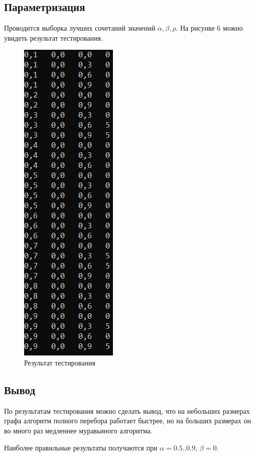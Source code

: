 \documentclass[14pt, a4paper]{extarticle}
\begin{document}
\subsection{Параметризация}
Проводится выборка лучших сочетаний значений $\alpha, \beta, \rho$. На рисунке 6 можно увидеть результат тестирования.
\begin{figure}[h!]
	\centering
	\includegraphics[scale=1]{source/test.png}
	\caption{Результат тестирования}
\end{figure}
\subsection{Вывод}
По результатам тестирования можно сделать вывод, что на небольших размерах графа алгоритм полного перебора работает быстрее, но на больших размерах он во много раз медленнее муравьиного алгоритма.\par
Наиболее правильные результаты получаются при $\alpha = 0.5..0.9$, $\beta = 0$.

\clearpage
\end{document}
